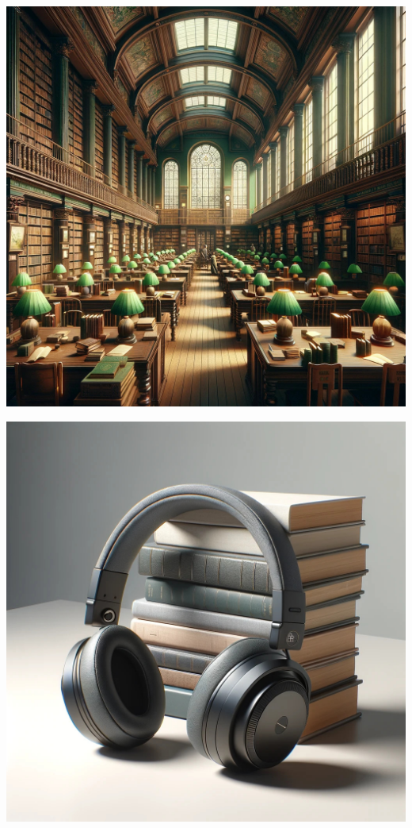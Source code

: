 \documentclass{novel}
\begin{document}
\begin{minipage}{0.33\textwidth}
    \includegraphics[width=1\textwidth]{resources/whitechapel.jpg}
\end{minipage}
\begin{minipage}{0.33\textwidth}
    \includegraphics[width=1\textwidth]{resources/headphones.jpg}
\end{minipage}\hfill
\end{document}
